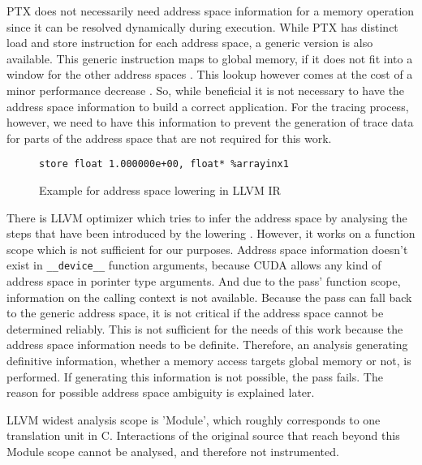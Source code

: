 PTX does not necessarily need address space information for a memory operation since it can be resolved dynamically during execution. While PTX has distinct load and store instruction for
each address space, a generic version is also available. This generic instruction maps to global memory, if
it does not fit into a window for the other address spaces \cite{cuda-man}. This lookup however comes at the cost of a minor performance decrease \cite{nvptx-infer-addr-space}. So, while beneficial it is not necessary to
have the address space information to build a correct application. For the tracing process, however, we need to have this information to prevent the generation of trace data for parts of the address space that are not required for this work.

\begin{figure}
	\begin{lstlisting}[style=C]
%arrayinx1 = getelementptr inbounds (float, float* addrspacecast (float addrspace(3)* @_ZZ5saxpyfPfS_iPlS0_E2_x to float*), i64 0, i64 2)
store float 1.000000e+00, float* %arrayinx1
	\end{lstlisting}
	\caption{Example for address space lowering in LLVM IR}
	\label{lowering}
\end{figure}

There is LLVM optimizer which tries to infer the address space by analysing the steps that have been introduced by the lowering \cite{nvptx-infer-addr-space}. However, it works on a function scope which is not sufficient for our purposes. Address space information  doesn't exist in \verb|__device__| function arguments, because CUDA allows any kind of 
address space in porinter type arguments. And due to the pass' function scope, information on the calling context is not available. Because the pass can fall back to the generic address space,
it is not critical if the address space cannot be determined reliably. This is not sufficient for the needs of this work because the address space information needs to be definite.
Therefore, an analysis generating definitive information, whether a memory access targets
global memory or not, is performed. If generating this information is not possible, the pass fails. The reason
for possible address space ambiguity is explained later.

LLVM widest analysis scope is 'Module', which roughly corresponds to one translation unit in C. Interactions of the original source that reach beyond this Module scope cannot be analysed, and therefore not instrumented.

